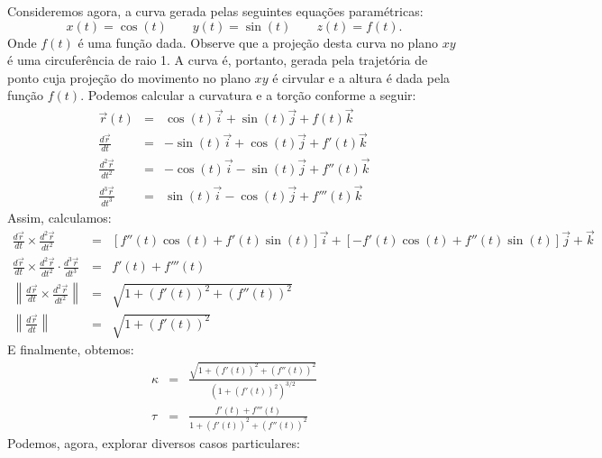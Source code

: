 \begin{ex} Consideremos agora, a curva gerada pelas seguintes equações paramétricas:
$$x(t)=\cos(t)\qquad y(t)=\sin(t)\qquad z(t)=f(t).$$
 Onde $f(t)$ é uma função dada. Observe que a projeção desta curva no plano $xy$ é uma circuferência de raio 1. A curva é, portanto, gerada pela trajetória de ponto cuja projeção do movimento no plano $xy$ é cirvular e a altura é dada pela função $f(t)$. Podemos calcular a curvatura e a torção conforme a seguir:
 \begin{eqnarray*}
  \vec{r}(t)&=&\cos(t)\vec{i}+\sin(t)\vec{j}+f(t)\vec{k}\\
  \frac{d\vec{r}}{dt}&=&-\sin(t)\vec{i}+\cos(t)\vec{j}+f'(t)\vec{k}\\
  \frac{d^2\vec{r}}{dt^2}&=&-\cos(t)\vec{i}-\sin(t)\vec{j}+f''(t)\vec{k}\\
  \frac{d^3\vec{r}}{dt^3}&=&\sin(t)\vec{i}-\cos(t)\vec{j}+f'''(t)\vec{k}
 \end{eqnarray*}
Assim, calculamos:
 \begin{eqnarray*}
  \frac{d\vec{r}}{dt} \times \frac{d^2 \vec{r}}{dt^2} &=&\left[f''(t)\cos(t)+f'(t)\sin(t)\right]\vec{i}+\left[-f'(t)\cos(t)+f''(t)\sin(t)\right]\vec{j}+\vec{k}\\
\frac{d \vec{r}}{dt} \times \frac{d^2\vec{r}}{dt^2} \cdot \frac{d^3\vec{r}}{dt^3} &=&f'(t)+f'''(t)\\
 \left\|\frac{d\vec{r}}{dt} \times\frac{d^2\vec{r}}{dt^2}\right\|&=&\sqrt{1+\left(f'(t)\right)^2+\left(f''(t)\right)^2}\\
 \left\|\frac{d\vec{r}}{dt}\right\|&=&\sqrt{1+\left(f'(t)\right)^2}
 \end{eqnarray*}
E finalmente, obtemos:
 \begin{eqnarray*}
\kappa&=&\frac{\sqrt{1+\left(f'(t)\right)^2+\left(f''(t)\right)^2}}{\left({1+\left(f'(t)\right)^2}\right)^{3/2}}\\
\tau&=&\frac{f'(t)+f'''(t)}{1+\left(f'(t)\right)^2+\left(f''(t)\right)^2}
 \end{eqnarray*}
Podemos, agora, explorar diversos casos particulares:
\end{ex}
